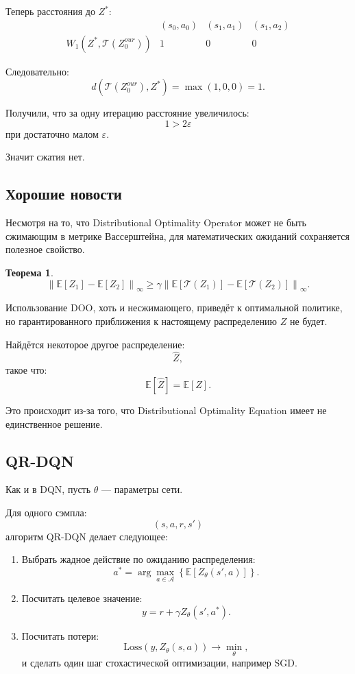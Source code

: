 \documentclass[12pt,a4paper]{article}
\newtheorem{theorem}{Теорема}
\begin{document}
Теперь расстояния до $Z^\ast$:
\[
\begin{array}{c|c|c|c}
 & (s_0,a_0) & (s_1,a_1) & (s_1,a_2) \\
\hline
W_1(Z^\ast,\mathcal T(Z^{our}_0)) & 1 & 0 & 0
\end{array}
\]

Следовательно:
\[
d
\left(
\mathcal T(Z^{our}_0),
Z^\ast
\right)
=
\max(1,0,0)
=
1.
\]

Получили, что за одну итерацию расстояние увеличилось:
\[
1 > 2\varepsilon
\]
при достаточно малом $\varepsilon$.

Значит сжатия нет.

\subsection{Хорошие новости}

Несмотря на то, что Distributional Optimality Operator может не быть сжимающим в метрике Вассерштейна, для математических ожиданий сохраняется полезное свойство.

\begin{theorem}
\[
\left\|
\mathbb E[Z_1]
-
\mathbb E[Z_2]
\right\|_\infty
\ge
\gamma
\left\|
\mathbb E[\mathcal T(Z_1)]
-
\mathbb E[\mathcal T(Z_2)]
\right\|_\infty.
\]
\end{theorem}

Использование DOO, хоть и несжимающего, приведёт к оптимальной политике, но гарантированного приближения к настоящему распределению $Z$ не будет.

Найдётся некоторое другое распределение:
\[
\hat Z,
\]
такое что:
\[
\mathbb E[\hat Z]
=
\mathbb E[Z].
\]

Это происходит из-за того, что Distributional Optimality Equation имеет не единственное решение.

\subsection{QR-DQN}

Как и в DQN, пусть $\theta$ --- параметры сети.

Для одного сэмпла:
\[
(s,a,r,s')
\]
алгоритм QR-DQN делает следующее:

\begin{enumerate}
    \item Выбрать жадное действие по ожиданию распределения:
    \[
    a^\ast
    =
    \arg\max_{a \in \mathcal A}
    \left\{
    \mathbb E
    \left[
    Z_\theta(s',a)
    \right]
    \right\}.
    \]

    \item Посчитать целевое значение:
    \[
    y
    =
    r
    +
    \gamma Z_\theta(s',a^\ast).
    \]

    \item Посчитать потери:
    \[
    \mathrm{Loss}
    \left(
    y,
    Z_\theta(s,a)
    \right)
    \to
    \min_\theta,
    \]
    и сделать один шаг стохастической оптимизации, например SGD.
\end{enumerate}
\end{document}
